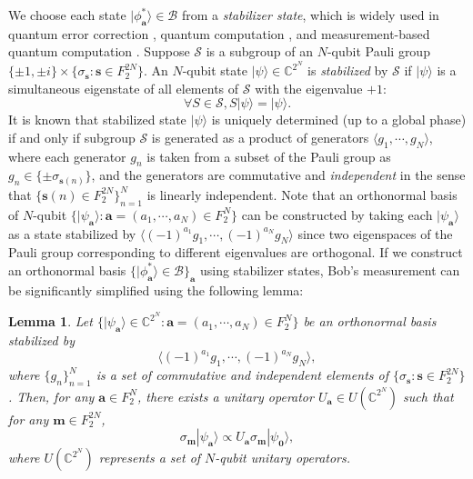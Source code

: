 \documentclass[aps,prx,twocolumn,showpacs,amsmath,notitlepage,amssymb,superscriptaddress]{revtex4-1}
\newcommand{\ket}[1]{| {#1} \rangle}
\newtheorem{lemma}{Lemma}
\begin{document}
We choose each state $\ket{\phi^*_{\mathbf{a}}}\in\mathcal{B}$ from a {\it stabilizer state}, which is widely used in quantum error correction \cite{GotPhD}, quantum computation \cite{GotKnill}, and measurement-based quantum computation \cite{MBQC}. Suppose $\mathcal{S}$ is a subgroup of an $N$-qubit Pauli group $\{\pm1,\pm i\}\times\{\sigma_{\mathbf{s}}:\mathbf{s}\in F_2^{2N}\}$. An $N$-qubit state $\ket{\psi}\in\mathbb{C}^{2^N}$ is {\it stabilized} by $\mathcal{S}$ if $\ket{\psi}$ is a simultaneous eigenstate of all elements of $\mathcal{S}$ with the eigenvalue $+1$:
\begin{equation}
 \forall S\in\mathcal{S},S\ket{\psi}=\ket{\psi}.
\end{equation}
It is known that stabilized state $\ket{\psi}$ is uniquely determined (up to a global phase) if and only if subgroup $\mathcal{S}$ is generated as a product of generators $\langle g_1,\cdots,g_N\rangle$, where each generator $g_n$ is taken from a subset of the Pauli group as $g_n\in\{\pm \sigma_{\mathbf{s}(n)}\}$, and the generators are commutative and {\it independent} in the sense that $\{\mathbf{s}(n)\in F_2^{2N}\}_{n=1}^N$ is linearly independent. Note that an orthonormal basis of $N$-qubit $\{\ket{\psi_{\mathbf{a}}}:\mathbf{a}=(a_1,\cdots,a_N)\in F_2^{N}\}$ can be constructed by taking each $\ket{\psi_{\mathbf{a}}}$ as a state stabilized by $\langle (-1)^{a_1}g_1,\cdots,(-1)^{a_N}g_N\rangle$ since two eigenspaces of the Pauli group corresponding to different eigenvalues are orthogonal. If we construct an orthonormal basis $\{\ket{\phi^*_{\mathbf{a}}}\in\mathcal{B}\}_{\mathbf{a}}$ using stabilizer states, Bob's measurement can be significantly simplified using the following lemma:

\begin{lemma}
\label{lemma:unitary}
 Let $\{\ket{\psi_{\mathbf{a}}}\in\mathbb{C}^{2^N}:\mathbf{a}=(a_1,\cdots,a_N)\in F_2^N\}$ be an orthonormal basis stabilized by
   \begin{equation}
 \langle(-1)^{a_1}g_1,\cdots,(-1)^{a_N}g_N\rangle,
 \label{eq:stabilizer}
\end{equation}
 where $\{g_n\}_{n=1}^N$ is a set of commutative and independent elements of $\{\sigma_{\mathbf{s}}:\mathbf{s}\in F_2^{2N}\}$. Then, for any $\mathbf{a}\in F_2^{N}$, there exists a unitary operator $U_{\mathbf{a}}\in U(\mathbb{C}^{2^N})$ such that for any $\mathbf{m}\in F_2^{2N}$,
 \begin{equation}
 \sigma_{\mathbf{m}}\ket{\psi_{\mathbf{a}}}\propto U_{\mathbf{a}}\sigma_{\mathbf{m}}\ket{\psi_{\mathbf{0}}},
\end{equation}
where $U(\mathbb{C}^{2^N})$ represents a set of $N$-qubit unitary operators.
\end{lemma}
\end{document}
